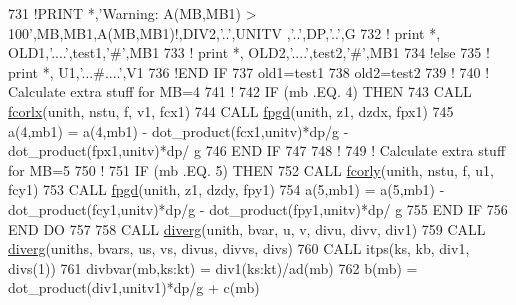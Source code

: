 \begin{DoxyCode}
731             \textcolor{comment}{!PRINT *,'Warning: A(MB,MB1) > 100',MB,MB1,A(MB,MB1)!,DIV2,'..',UNITV ,'..',DP,'..',G}
732             \textcolor{comment}{!  print *, OLD1,'....',test1,'#',MB1}
733             \textcolor{comment}{!  print *, OLD2,'....',test2,'#',MB1}
734         \textcolor{comment}{!else}
735         \textcolor{comment}{!    print *, U1,'...#....',V1}
736         \textcolor{comment}{!END IF}
737         old1=test1
738         old2=test2
739         \textcolor{comment}{!}
740         \textcolor{comment}{! Calculate extra stuff for MB=4}
741         \textcolor{comment}{!}
742         \textcolor{keywordflow}{IF} (mb .EQ. 4) \textcolor{keywordflow}{THEN}
743             \textcolor{keyword}{CALL }\hyperlink{namespacephysics_a56a179b5bd2c13a2201b2367037a42cf}{fcorlx}(unith, nstu, f, v1, fcx1)
744             \textcolor{keyword}{CALL }\hyperlink{namespacephysics_acf841366af6f4fd7502b4031a2cacb56}{fpgd}(unith, z1, dzdx, fpx1)
745             a(4,mb1)    = a(4,mb1) - dot\_product(fcx1,unitv)*dp/\hyperlink{namespaceconstants_a046aef138fbc8d05251d4fdc6eb3ee89}{g} - dot\_product(fpx1,unitv)*dp/
      \hyperlink{namespaceconstants_a046aef138fbc8d05251d4fdc6eb3ee89}{g}
746 \textcolor{keywordflow}{        END IF}
747 
748         \textcolor{comment}{!}
749         \textcolor{comment}{! Calculate extra stuff for MB=5}
750         \textcolor{comment}{!}
751         \textcolor{keywordflow}{IF} (mb .EQ. 5) \textcolor{keywordflow}{THEN}
752             \textcolor{keyword}{CALL }\hyperlink{namespacephysics_a1f64bd544ea55c7fbbf5330725fc0896}{fcorly}(unith, nstu, f, u1, fcy1)
753             \textcolor{keyword}{CALL }\hyperlink{namespacephysics_acf841366af6f4fd7502b4031a2cacb56}{fpgd}(unith, z1, dzdy, fpy1)
754             a(5,mb1)    = a(5,mb1) - dot\_product(fcy1,unitv)*dp/\hyperlink{namespaceconstants_a046aef138fbc8d05251d4fdc6eb3ee89}{g} - dot\_product(fpy1,unitv)*dp/
      \hyperlink{namespaceconstants_a046aef138fbc8d05251d4fdc6eb3ee89}{g}
755 \textcolor{keywordflow}{        END IF}
756 \textcolor{keywordflow}{    END DO}
757 
758     \textcolor{keyword}{CALL }\hyperlink{namespacephysics_adc35216d512f6586071a79fba286a39c}{diverg}(unith, bvar, u, v, divu, divv, div1)
759     \textcolor{keyword}{CALL }\hyperlink{namespacephysics_adc35216d512f6586071a79fba286a39c}{diverg}(uniths, bvars, us, vs, divus, divvs, divs)
760     \textcolor{keyword}{CALL }itps(ks, kb, div1, divs(1))
761     divbvar(mb,ks:kt)   = div1(ks:kt)/ad(mb)
762     b(mb)               = dot\_product(div1,unitv1)*dp/\hyperlink{namespaceconstants_a046aef138fbc8d05251d4fdc6eb3ee89}{g} + c(mb)

\end{DoxyCode}
